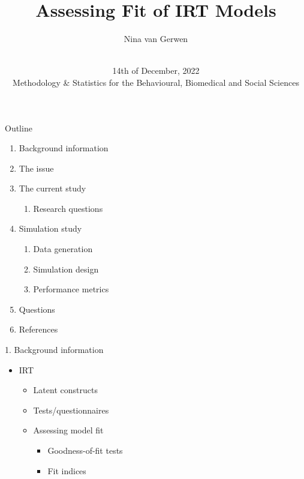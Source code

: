 \documentclass[aspectratio=169]{beamer}
\title{Assessing Fit of IRT Models}
\author{Nina van Gerwen}
\date{\vspace{2cm} \\ 14th of December, 2022 \\
\small{Methodology \& Statistics for the Behavioural, Biomedical and Social Sciences}}
\begin{document}
\maketitle

\begin{frame}{Outline}

\begin{enumerate}
	\item{Background information}
	\item{The issue}
	\item{The current study}
		\begin{enumerate}
			\item{Research questions}
		\end{enumerate}
	\item{Simulation study}
		\begin{enumerate}
			\item{Data generation}
			\item{Simulation design}
			\item{Performance metrics}
		\end{enumerate}
	\item{Questions}
	\item{References}
\end{enumerate}

\end{frame}

\begin{frame}{1. Background information}

\begin{itemize}
	\item{IRT}
		\begin{itemize}
			\item{Latent constructs}
			\item{Tests/questionnaires}
			\item{Assessing model fit}
				\begin{itemize}
					\item{Goodness-of-fit tests}
					\item{Fit indices}
				\end{itemize}
		\end{itemize}
\end{itemize}

\end{frame}
\end{document}
